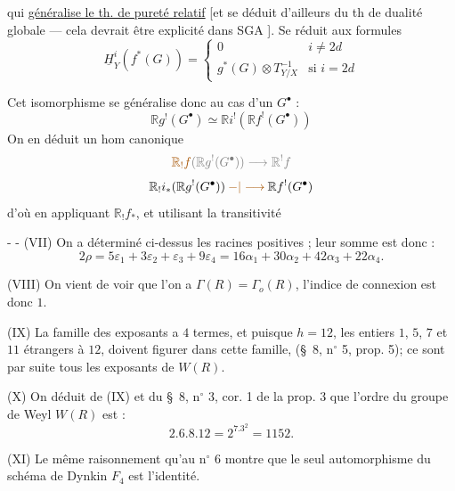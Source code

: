 qui \uline{généralise le th. de pureté relatif}
[et se déduit d'ailleurs du th de dualité globale --- cela devrait être explicité dans SGA ].
Se réduit aux formules
\[
\underline H^i_Y(f^*(G))=
\begin{cases}
0 & i\ne2d\\
g^*(G)\otimes T_{Y/X}^{-1} & \text{si }i=2d
\end{cases}
\]

Cet isomorphisme se généralise donc au cas d'un $G^\bullet$ :
\[
\mathbb{R}g^!(G^\bullet)\simeq \mathbb{R}i^!(\mathbb{R}f^!(G^\bullet))
\]
On en déduit un hom canonique
\[
\deleted{\unsure{\mathbb{R}_!f}(\mathbb{R}g^!(G^\bullet))\longrightarrow \mathbb{R}^!f}
\]
\[
\mathbb{R}_!i_*(\mathbb{R}g^!(G^\bullet))\mathbin{\unsure{-|\longrightarrow}}\mathbb{R}f^!(G^\bullet)
\]
d'où en appliquant $\mathbb{R}_!f_*$, et utilisant la transitivité

-  -
(VII) On a déterminé ci-dessus les racines positives ; leur somme est donc :
\[
2\rho=5\varepsilon_1+3\varepsilon_2+\varepsilon_3+9\varepsilon_4
=16\alpha_1+30\alpha_2+42\alpha_3+22\alpha_4.
\]

(VIII) On vient de voir que l'on a $\Gamma(R)=\Gamma_o(R)$, l'indice de connexion est donc $1$.

(IX) La famille des exposants a $4$ termes, et puisque $h=12$, les entiers $1$, $5$, $7$ et $11$ étrangers à $12$, doivent figurer dans cette famille, (\S\ 8, n$^\circ$ 5, prop. 5); ce sont par suite tous les exposants de $W(R)$.

(X) On déduit de (IX) et du \S\ 8, n$^\circ$ 3, cor. 1 de la prop. 3 que l'ordre du groupe de Weyl $W(R)$ est :
\[
2.6.8.12=2^7.3^2=1152.
\]

(XI) Le même raisonnement qu'au n$^\circ$ 6 montre que le seul automorphisme du schéma de Dynkin $F_4$ est l'identité.

